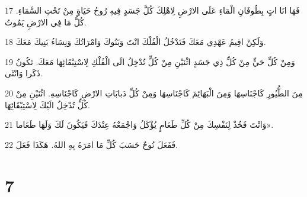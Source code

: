 \par 17 فَهَا انَا اتٍ بِطُوفَانِ الْمَاءِ عَلَى الارْضِ لِاهْلِكَ كُلَّ جَسَدٍ فِيهِ رُوحُ حَيَاةٍ مِنْ تَحْتِ السَّمَاءِ. كُلُّ مَا فِي الارْضِ يَمُوتُ.
\par 18 وَلَكِنْ اقِيمُ عَهْدِي مَعَكَ فَتَدْخُلُ الْفُلْكَ انْتَ وَبَنُوكَ وَامْرَاتُكَ وَنِسَاءُ بَنِيكَ مَعَكَ.
\par 19 وَمِنْ كُلِّ حَيٍّ مِنْ كُلِّ ذِي جَسَدٍ اثْنَيْنِ مِنْ كُلٍّ تُدْخِلُ الَى الْفُلْكِ لِاسْتِبْقَائِهَا مَعَكَ. تَكُونُ ذَكَرا وَانْثَى.
\par 20 مِنَ الطُّيُورِ كَاجْنَاسِهَا وَمِنَ الْبَهَائِمَ كَاجْنَاسِهَا وَمِنْ كُلِّ دَبابَاتِ الارْضِ كَاجْنَاسِهِ. اثْنَيْنِ مِنْ كُلٍّ تُدْخِلُ الَيْكَ لِاسْتِبْقَائِهَا.
\par 21 وَانْتَ فَخُذْ لِنَفْسِكَ مِنْ كُلِّ طَعَامٍ يُؤْكَلُ وَاجْمَعْهُ عِنْدَكَ فَيَكُونَ لَكَ وَلَهَا طَعَاما».
\par 22 فَفَعَلَ نُوحٌ حَسَبَ كُلِّ مَا امَرَهُ بِهِ اللهُ. هَكَذَا فَعَلَ.

\chapter{7}

